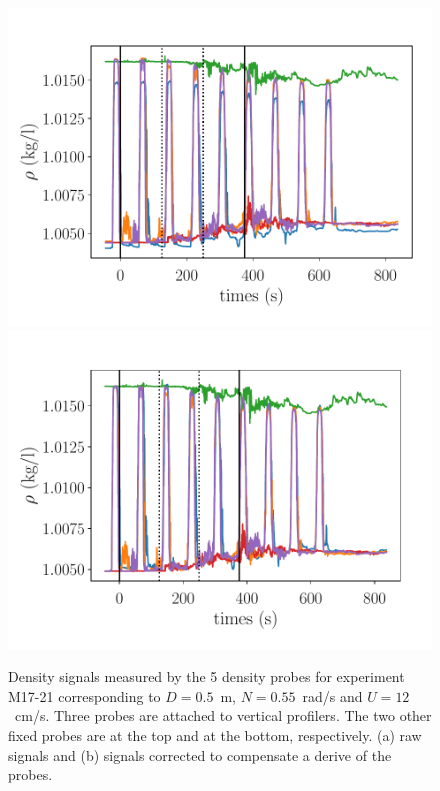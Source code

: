 \begin{figure}[htp!]
\includegraphics[width=\figwidth]{tmp/fig_rho_vs_time}\\
\includegraphics[width=\figwidth]{tmp/fig_rho_vs_time_corrected}
\label{fig:rho:vs:time}

\caption{Density signals measured by the 5 density probes for experiment M17-21
corresponding to $D = 0.5$~m, $N=0.55$~rad/s and $U=12$~cm/s. Three probes are
attached to vertical profilers. The two other fixed probes are at the top and
at the bottom, respectively. (a) raw signals and (b) signals corrected to
compensate a derive of the probes.
}

\end{figure}

